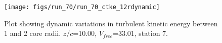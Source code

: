 \begin{figure}[H]
\centering
\texttt{[image: figs/run\_70/run\_70\_ctke\_12rdynamic]}
\caption{Plot showing dynamic variations in turbulent kinetic energy between 1 and 2 core radii. $z/c$=10.00, $V_{free}$=33.01, station 7.}
\end{figure}


